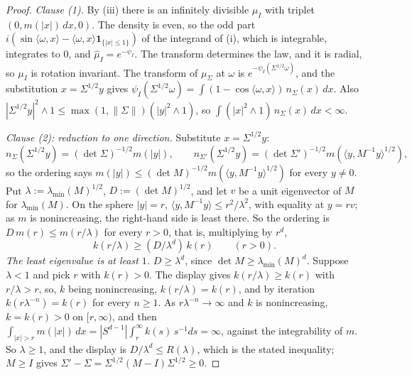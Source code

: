\begin{proof}
\leanok
\emph{Clause (1).} By (iii) there is an infinitely divisible $\mu_I$ with triplet
$(0, m(|x|)\,dx, 0)$. The density is even, so the odd part
$i(\sin\langle\omega,x\rangle - \langle\omega,x\rangle\mathbf 1_{\{|x| \le 1\}})$ of the integrand of
(i), which is integrable, integrates to $0$, and $\widehat\mu_I = e^{-\psi_I}$. The transform
determines the law, and it is radial, so $\mu_I$ is rotation invariant. The transform of $\mu_\Sigma$ at $\omega$ is
$e^{-\psi_I(\Sigma^{1/2}\omega)}$, and the substitution $x = \Sigma^{1/2}y$ gives
$\psi_I(\Sigma^{1/2}\omega) = \int(1 - \cos\langle\omega,x\rangle)\,n_\Sigma(x)\,dx$. Also
$|\Sigma^{1/2}y|^2 \wedge 1 \le \max(1, \|\Sigma\|)(|y|^2 \wedge 1)$, so
$\int(|x|^2 \wedge 1)\,n_\Sigma(x)\,dx < \infty$.

\emph{Clause (2): reduction to one direction.} Substitute $x = \Sigma^{1/2}y$:
\[
  n_\Sigma(\Sigma^{1/2}y) = (\det\Sigma)^{-1/2}m(|y|) , \qquad
  n_{\Sigma'}(\Sigma^{1/2}y) = (\det\Sigma')^{-1/2}m(\langle y,M^{-1}y\rangle^{1/2}) ,
\] so the ordering
says $m(|y|) \le (\det M)^{-1/2}m(\langle y,M^{-1}y\rangle^{1/2})$ for every $y \ne 0$. Put
$\lambda := \lambda_{\min}(M)^{1/2}$, $D := (\det M)^{1/2}$, and let $v$ be a unit eigenvector of $M$ for
$\lambda_{\min}(M)$. On the sphere $|y| = r$, $\langle y,M^{-1}y\rangle \le r^2/\lambda^2$, with equality at
$y = rv$; as $m$ is nonincreasing, the right-hand side is least there. So the ordering is
$D\,m(r) \le m(r/\lambda)$ for every $r > 0$, that is, multiplying by $r^d$,
\[
  k(r/\lambda) \ge (D/\lambda^d)\,k(r) \qquad (r > 0).
\]
\emph{The least eigenvalue is at least $1$.} $D \ge \lambda^d$, since $\det M \ge \lambda_{\min}(M)^d$.
Suppose $\lambda < 1$ and pick $r$ with $k(r) > 0$. The display gives $k(r/\lambda) \ge k(r)$ with
$r/\lambda > r$, so, $k$ being nonincreasing, $k(r/\lambda) = k(r)$, and by iteration
$k(r\lambda^{-n}) = k(r)$ for every $n \ge 1$. As $r\lambda^{-n} \to \infty$ and $k$ is nonincreasing,
$k = k(r) > 0$ on $[r,\infty)$, and then $\int_{|x| > r}m(|x|)\,dx = |S^{d-1}|\int_r^\infty k(s)\,s^{-1}ds
= \infty$, against the integrability of $m$. So $\lambda \ge 1$, and the display is $D/\lambda^d \le R(\lambda)$, which is the stated
inequality; $M \ge I$ gives $\Sigma' - \Sigma = \Sigma^{1/2}(M - I)\Sigma^{1/2} \ge 0$.


\end{proof}
